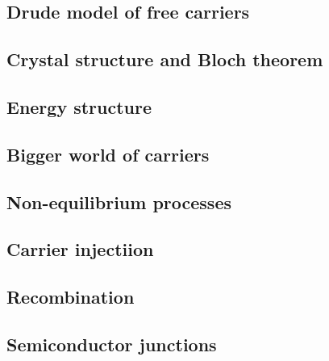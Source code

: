 \subsection{Drude model of free carriers}

\subsection{Crystal structure and Bloch theorem}

\subsection{Energy structure}

\subsection{Bigger world of carriers}

\subsection{Non-equilibrium processes}

\subsection{Carrier injectiion}	

\subsection{Recombination}

\subsection{Semiconductor junctions}

	